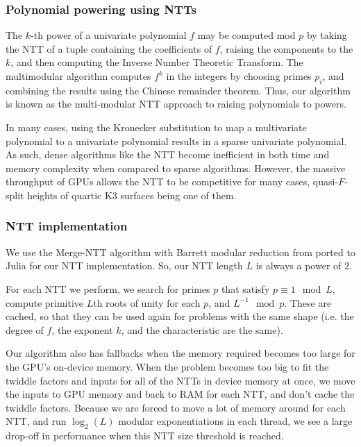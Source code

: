 \subsubsection{Polynomial powering using NTTs}
The \(k\)-th power of a univariate polynomial \(f\)
may be computed mod \(p\) by taking the NTT 
of a tuple containing the coefficients of \(f\),
raising the components to the \(k\),
and then computing the Inverse Number Theoretic Transform.
The multimodular algorithm 
computes \(f^{k}\) in the integers by
choosing primes \(p_{i}\), 
and combining the results using the Chinese remainder theorem.
Thus, our algorithm is known as the 
multi-modular NTT approach to raising polynomials to powers.

In many cases, using the Kronecker substitution to 
map a multivariate polynomial to a univariate polynomial results in 
a sparse univariate polynomial. As such, dense 
algorithms like the NTT become inefficient in both 
time and memory complexity when compared to sparse algorithms.
However, the massive throughput of GPUs allows the 
NTT to be competitive for many cases, 
quasi-\(F\)-split heights of quartic K3 surfaces being 
one of them.

\subsubsection{NTT implementation}

We use the Merge-NTT algorithm with Barrett modular 
reduction from \cite{ozcan-2023-fft} 
ported to Julia for our NTT implementation. 
So, our NTT length $L$ is always a power of $2$. 

For each NTT we perform, we search for primes $p$ that satisfy 
$p \equiv 1 \mod L$, compute primitive $L$th roots of unity 
for each $p$, and $L^{-1} \mod p$. 
These are cached, so that they can be used again for problems with the same shape 
(i.e. the degree of \(f\), the exponent \(k\), and the characteristic are the same).

Our algorithm also has fallbacks when the memory required becomes too large for the 
GPU's on-device memory.
When the problem becomes too big to fit the twiddle factors and 
inputs for all of the NTTs in device memory at once, 
we move the inputs to GPU memory and 
back to RAM for each NTT, and don't cache the twiddle factors. 
Because we are forced to move a lot of memory around for each NTT, 
and run $\log_2(L)$ modular exponentiations in each thread,
we see a large drop-off in 
performance when this NTT size threshold is reached. 


